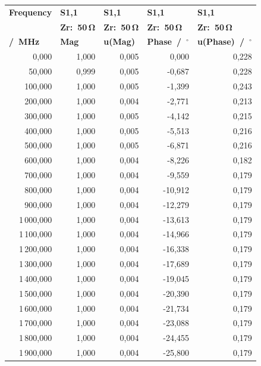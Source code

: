 \begin{longtable}{rrrrr}
\multicolumn{1}{l}{\textbf{Frequency}} & \multicolumn{1}{l}{\textbf{S1,1}} & \multicolumn{1}{l}{\textbf{S1,1}} & \multicolumn{1}{l}{\textbf{S1,1}} & \multicolumn{1}{l}{\textbf{S1,1}}\\
\multicolumn{1}{l}{\textbf{}} & \multicolumn{1}{l}{\textbf{Zr:~50\,$\mathbf{\Omega}$}} & \multicolumn{1}{l}{\textbf{Zr:~50\,$\mathbf{\Omega}$}} & \multicolumn{1}{l}{\textbf{Zr:~50\,$\mathbf{\Omega}$}} & \multicolumn{1}{l}{\textbf{Zr:~50\,$\mathbf{\Omega}$}}\\
\multicolumn{1}{l}{\textbf{/~MHz}} & \multicolumn{1}{l}{\textbf{Mag}} & \multicolumn{1}{l}{\textbf{u(Mag)}} & \multicolumn{1}{l}{\textbf{Phase~/~$\mathbf{^{\circ}}$}} & \multicolumn{1}{l}{\textbf{u(Phase)~/~$\mathbf{^{\circ}}$}}\\
\hline
\endhead
0,000 & 1,000 & 0,005 & 0,000 & 0,228\\
50,000 & 0,999 & 0,005 & -0,687 & 0,228\\
100,000 & 1,000 & 0,005 & -1,399 & 0,243\\
200,000 & 1,000 & 0,004 & -2,771 & 0,213\\
300,000 & 1,000 & 0,005 & -4,142 & 0,215\\
400,000 & 1,000 & 0,005 & -5,513 & 0,216\\
500,000 & 1,000 & 0,005 & -6,871 & 0,216\\
600,000 & 1,000 & 0,004 & -8,226 & 0,182\\
700,000 & 1,000 & 0,004 & -9,559 & 0,179\\
800,000 & 1,000 & 0,004 & -10,912 & 0,179\\
900,000 & 1,000 & 0,004 & -12,279 & 0,179\\
1\,000,000 & 1,000 & 0,004 & -13,613 & 0,179\\
1\,100,000 & 1,000 & 0,004 & -14,966 & 0,179\\
1\,200,000 & 1,000 & 0,004 & -16,338 & 0,179\\
1\,300,000 & 1,000 & 0,004 & -17,689 & 0,179\\
1\,400,000 & 1,000 & 0,004 & -19,045 & 0,179\\
1\,500,000 & 1,000 & 0,004 & -20,390 & 0,179\\
1\,600,000 & 1,000 & 0,004 & -21,734 & 0,179\\
1\,700,000 & 1,000 & 0,004 & -23,088 & 0,179\\
1\,800,000 & 1,000 & 0,004 & -24,455 & 0,179\\
1\,900,000 & 1,000 & 0,004 & -25,800 & 0,179\\

\end{longtable}
